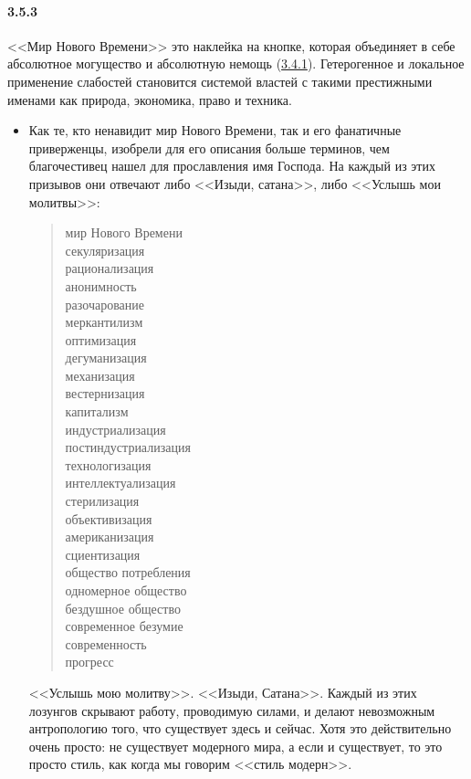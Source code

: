 \paragraph{3.5.3}\hypertarget{par:3.5.3}{} <<Мир Нового Времени>> это наклейка на кнопке, которая объединяет в себе абсолютное могущество и абсолютную немощь (\hyperlink{par:3.4.1}{3.4.1}). Гетерогенное и локальное применение слабостей становится системой властей с такими престижными именами как природа, экономика, право и техника.
	\begin{itemize}
	\item 
	Как те, кто ненавидит мир Нового Времени, так и его фанатичные приверженцы, изобрели для его описания больше терминов, чем благочестивец нашел для прославления имя Господа. На каждый из этих призывов они отвечают либо <<Изыди, сатана>>, либо <<Услышь мои молитвы>>:

		\begin{verse}
		мир Нового Времени \\
		секуляризация  \\
		рационализация \\
		анонимность \\
		разочарование \\
		меркантилизм \\
		оптимизация \\
		дегуманизация \\
		механизация \\
		вестернизация \\
		капитализм \\
		индустриализация \\
		постиндустриализация \\
		технологизация \\
		интеллектуализация \\
		стерилизация \\
		объективизация \\
		американизация \\
		сциентизация \\
		общество потребления \\
		одномерное общество \\
		бездушное общество \\
		современное безумие \\
		современность \\
		прогресс
		\end{verse}

	<<Услышь мою молитву>>. <<Изыди, Сатана>>. Каждый из этих лозунгов скрывают работу, проводимую силами, и делают невозможным антропологию того, что существует здесь и сейчас. Хотя это действительно очень просто: не существует модерного мира, а если и существует, то это просто стиль, как когда мы говорим <<стиль модерн>>.
	\end{itemize}


